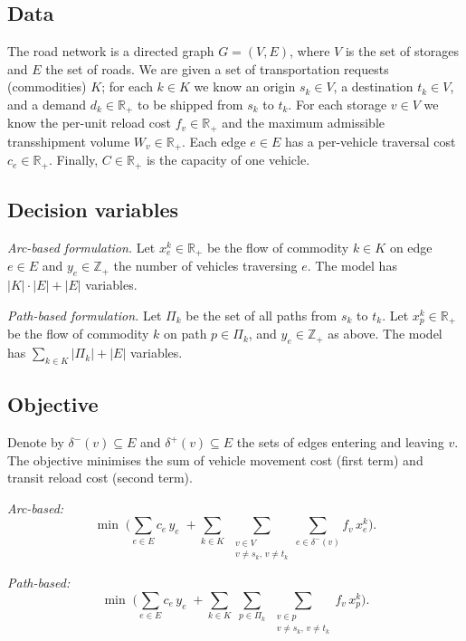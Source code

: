 \documentclass[runningheads]{llncs}
\newcommand{\E}{E}
\newcommand{\Vv}{V}
\newcommand{\Real}{\mathbb{R}}
\newcommand{\Int}{\mathbb{Z}}
\begin{document}
\subsection{Data}
The road network is a directed graph $G=(\Vv,\E)$, where $\Vv$ is the set of
storages and $\E$ the set of roads. We are given a set of transportation
requests (commodities) $K$; for each $k\in K$ we know an origin $s_k\in \Vv$,
a destination $t_k\in \Vv$, and a demand $d_k\in\Real_+$ to be shipped from
$s_k$ to $t_k$. For each storage $v\in \Vv$ we know the per-unit reload cost
$f_v\in\Real_+$ and the maximum admissible transshipment volume
$W_v\in\Real_+$. Each edge $e\in \E$ has a per-vehicle traversal cost
$c_e\in\Real_+$. Finally, $C\in\Real_+$ is the capacity of one vehicle.

\subsection{Decision variables}
\textit{Arc-based formulation.} Let $x^k_e\in\Real_+$ be the flow of commodity
$k\in K$ on edge $e\in \E$ and $y_e\in\Int_+$ the number of vehicles traversing
$e$. The model has $|K|\cdot|\E|+|\E|$ variables.

\textit{Path-based formulation.} Let $\Pi_k$ be the set of all paths from $s_k$
to $t_k$. Let $x^k_p\in\Real_+$ be the flow of commodity $k$ on path
$p\in\Pi_k$, and $y_e\in\Int_+$ as above. The model has
$\sum_{k\in K}|\Pi_k|+|\E|$ variables.

\subsection{Objective}
Denote by $\delta^-(v)\subseteq \E$ and $\delta^+(v)\subseteq \E$ the sets of
edges entering and leaving $v$. The objective minimises the sum of vehicle
movement cost (first term) and transit reload cost (second term).

\noindent\emph{Arc-based:}
\begin{equation}
\min\;\Bigg(\sum_{e\in \E} c_e\,y_e
 \;+\!\!\sum_{k\in K}\;\sum_{\substack{v\in \Vv\\ v\neq s_k,\,v\neq t_k}}
 \sum_{e\in\delta^-(v)} f_v\,x^k_e\Bigg).
\label{eq:obj-arc}
\end{equation}

\noindent\emph{Path-based:}
\begin{equation}
\min\;\Bigg(\sum_{e\in \E} c_e\,y_e
 \;+\!\!\sum_{k\in K}\;\sum_{p\in\Pi_k}\;
 \sum_{\substack{v\in p\\ v\neq s_k,\,v\neq t_k}} f_v\,x^k_p\Bigg).
\label{eq:obj-path}
\end{equation}
\end{document}
